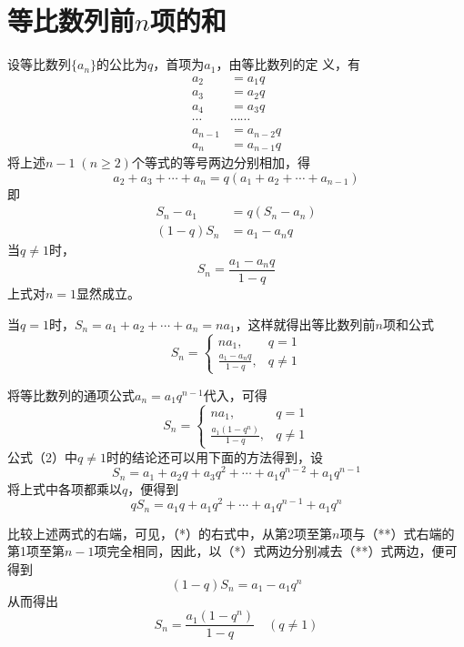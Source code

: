 \section{等比数列前$n$项的和}
设等比数列$\{a_n\}$的公比为$q$，首项为$a_1$，由等比数列的定
义，有
\[\begin{split}
    a_2&=a_1q\\
    a_3&=a_2q\\
    a_4&=a_3q\\
    \cdots&\cdots\cdots\\
    a_{n-1}&=a_{n-2}q\\
    a_n &=a_{n-1}q
\end{split}\]
将上述$n-1\; (n\ge 2)$个等式的等号两边分别相加，得
\[a_2+a_3+\cdots +a_n=q(a_1+a_2+\cdots +a_{n-1})\]
即
\[\begin{split}
S_n-a_1&=q(S_n-a_n)\\
(1-q)S_n&=a_1-a_nq     
\end{split}\]
当$q\ne 1$时，$$S_n=\frac{a_1-a_n q}{1-q}$$
上式对$n=1$显然成立。

当$q=1$时，$S_n=a_1+a_2+\cdots +a_n=na_1$，这样就得出等比数列前$n$项和公式
\begin{equation}
    S_n=\begin{cases}
        na_1,  & q=1\\[1.5ex]
        \frac{a_1-a_nq}{1-q},& q\ne 1
    \end{cases}\tag{1}
\end{equation}

将等比数列的通项公式$a_n=a_1q^{n-1}$代入，可得
\begin{equation}
    S_n=\begin{cases}
        na_1,  & q=1\\[1.5ex]
        \frac{a_1(1-q^n)}{1-q},& q\ne 1
    \end{cases}\tag{2}
\end{equation}
公式（2）中$q\ne 1$时的结论还可以用下面的方法得到，设
\begin{equation}
    S_n=a_1+a_2q+a_3q^2+\cdots+a_1q^{n-2}+a_1q^{n-1} \tag{*}
\end{equation}
将上式中各项都乘以$q$，便得到
\begin{equation}
  qS_n=a_1q+a_1q^2+\cdots+a_1q^{n-1}+a_1q^n \tag{**}  
\end{equation}

比较上述两式的右端，可见，（*）的右式中，从第2项至第$n$项与（**）式右端的第1项至第$n-1$项完全相同，因此，以（*）式两边分别减去（**）式两边，便可得到
\[(1-q)S_n=a_1-a_1q^n\]
从而得出
\[S_n=\frac{a_1(1-q^n)}{1-q}\quad (q\ne 1)\]

